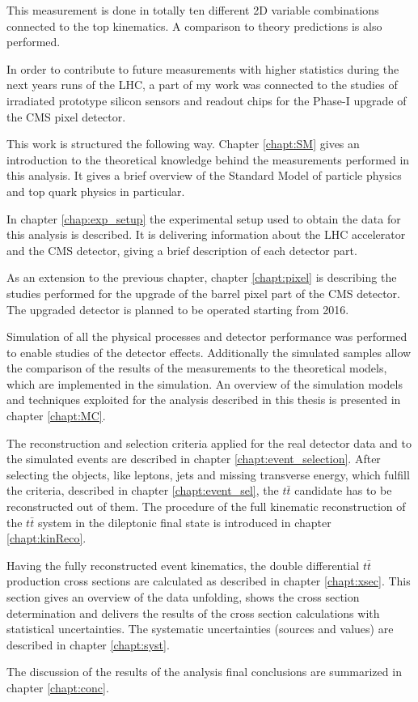 This measurement is done in totally ten different 2D variable combinations
connected to the top kinematics. A comparison to theory predictions is also performed.

In order to contribute to future measurements with higher statistics during
the next years runs of the LHC, a part of my work was connected to the studies of irradiated
prototype silicon sensors and readout chips for the Phase-I upgrade of the CMS pixel detector.

This work is structured the following way. Chapter \ref{chapt:SM} gives an introduction to the theoretical
knowledge behind the measurements performed in this analysis. It gives a brief overview of the Standard
Model of particle physics and top quark physics in particular.

In chapter \ref{chap:exp_setup} the experimental setup used to obtain the data for this analysis is described.
It is delivering information about the LHC accelerator and the CMS detector, giving a brief description of each detector part.

As an extension to the previous chapter, chapter \ref{chapt:pixel} is describing the studies performed for the
upgrade of the barrel pixel part of the CMS detector. The upgraded detector is planned to be operated starting from 2016.

Simulation of all the physical processes and detector performance was performed to enable studies of the detector effects.
Additionally the simulated samples allow the comparison of the results of the measurements to the theoretical models, 
which are implemented in the simulation. An overview of the simulation
models and techniques exploited for the analysis described in this thesis is presented in chapter \ref{chapt:MC}.

The reconstruction and selection criteria applied for the real detector data and to the simulated events are described
in chapter \ref{chapt:event_selection}. After selecting the objects, like leptons, jets and missing transverse energy, which 
fulfill the criteria, described in chapter \ref{chapt:event_sel}, the $t\bar{t}$ candidate has to be reconstructed out
of them. The procedure of the full kinematic reconstruction of the $t\bar{t}$ system in the dileptonic final state is introduced
in chapter \ref{chapt:kinReco}.

Having the fully reconstructed event kinematics, the double differential $t\bar{t}$ production cross sections are calculated
as described in chapter \ref{chapt:xsec}. This section gives an overview of the data unfolding, shows the cross section determination 
and delivers the results of the cross section calculations with statistical uncertainties. The systematic uncertainties (sources and 
values) are described in chapter \ref{chapt:syst}.

The discussion of the results of the analysis final conclusions are summarized in chapter \ref{chapt:conc}.